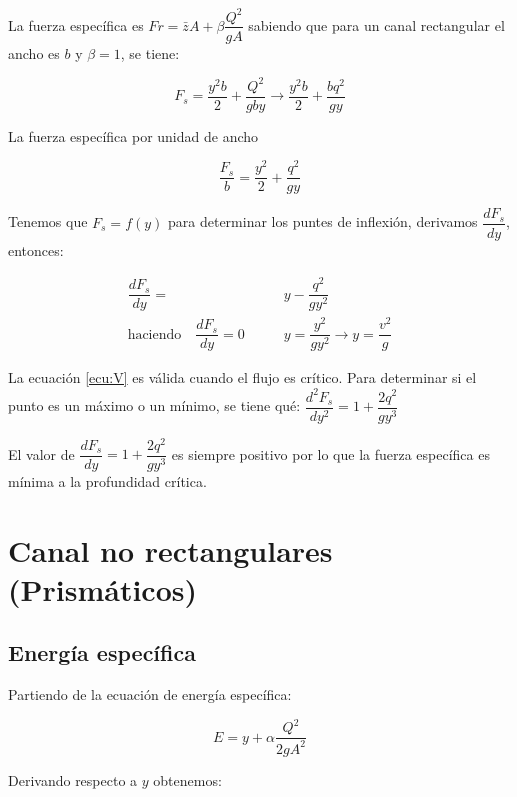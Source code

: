 \documentclass[a4paper, 11pt]{article}
\begin{document}
La fuerza específica es $Fr=\bar{z}A+\beta\dfrac{Q^{2}}{gA}$ sabiendo que para un canal rectangular el ancho es $b$ y $\beta=1$, se tiene:

\begin{equation}
    F_{s}=\dfrac{y^{2}b}{2}+\dfrac{Q^{2}}{gby} \rightarrow \dfrac{y^{2}b}{2}+\dfrac{bq^{2}}{gy}
\end{equation}

La fuerza específica por unidad de ancho

\begin{equation}
    \dfrac{F_{s}}{b}=\dfrac{y^{2}}{2}+\dfrac{q^{2}}{gy}
\end{equation}

Tenemos que $F_{s}=f(y)$ para determinar los puntes de inflexión, derivamos $\dfrac{dF_{s}}{dy}$, entonces:

\begin{equation}
    \begin{aligned}
        \dfrac{dF_{s}}{dy}=&y-\dfrac{q^{2}}{gy^{2}}\\
        \text{haciendo} \quad \dfrac{dF_{s}}{dy}=0 \qquad &y=\dfrac{y^{2}}{gy^{2}}\rightarrow y=\dfrac{v^{2}}{g}
    \end{aligned}
    \label{ecu:V}
\end{equation}

La ecuación \ref{ecu:V} es válida cuando el flujo es crítico. Para determinar si el punto es un máximo o un mínimo, se tiene qué: $\dfrac{d^{2}F_{s}}{dy^{2}}=1+\dfrac{2q^{2}}{gy^{3}}$ \vspace{1ex}

El valor de $\dfrac{dF_{s}}{dy}=1+\dfrac{2q^{2}}{gy^{3}}$ es siempre positivo por lo que la fuerza específica es mínima a la profundidad crítica.

\section{Canal no rectangulares (Prismáticos)}

\subsection{Energía específica}

Partiendo de la ecuación de energía específica:

\begin{equation}
    E=y+\alpha \dfrac{Q^{2}}{2gA^{2}}
\end{equation}

Derivando respecto a $y$ obtenemos:
\end{document}
